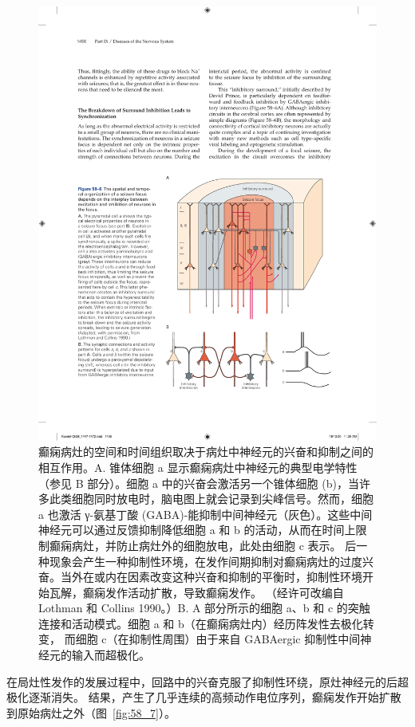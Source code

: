 \begin{figure}[htbp]
	\centering
	\includegraphics[width=0.7\linewidth]{chap58/fig_58_6}
	\caption{癫痫病灶的空间和时间组织取决于病灶中神经元的兴奋和抑制之间的相互作用。A. 锥体细胞 a 显示癫痫病灶中神经元的典型电学特性（参见 B 部分）。细胞 a 中的兴奋会激活另一个锥体细胞 (b)，当许多此类细胞同时放电时，脑电图上就会记录到尖峰信号。然而，细胞 a 也激活 γ-氨基丁酸 (GABA)-能抑制中间神经元（灰色）。这些中间神经元可以通过反馈抑制降低细胞 a 和 b 的活动，从而在时间上限制癫痫病灶，并防止病灶外的细胞放电，此处由细胞 c 表示。 后一种现象会产生一种抑制性环境，在发作间期抑制对癫痫病灶的过度兴奋。当外在或内在因素改变这种兴奋和抑制的平衡时，抑制性环境开始瓦解，癫痫发作活动扩散，导致癫痫发作。 （经许可改编自 Lothman 和 Collins 1990。）B. A 部分所示的细胞 a、b 和 c 的突触连接和活动模式。细胞 a 和 b（在癫痫病灶内）经历阵发性去极化转变， 而细胞 c（在抑制性周围）由于来自 GABAergic 抑制性中间神经元的输入而超极化。}
	\label{fig:58_6}
\end{figure}


在局灶性发作的发展过程中，回路中的兴奋克服了抑制性环绕，原灶神经元的后超极化逐渐消失。
结果，产生了几乎连续的高频动作电位序列，癫痫发作开始扩散到原始病灶之外（图~\ref{fig:58_7}）。


